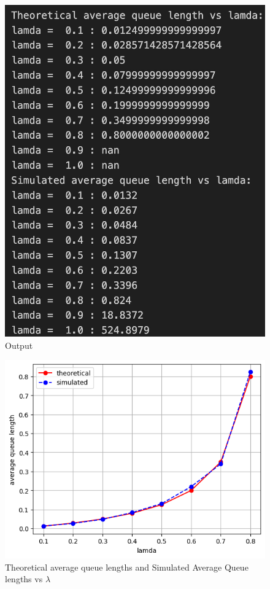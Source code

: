 \documentclass[11pt, a4paper]{article}
\begin{document}
\begin{figure}[H]
     \centering
     \includegraphics[scale=0.3]{Figure_6.png}
     \caption{Output}
\end{figure}
\begin{figure}[H]
     \centering
     \includegraphics[scale=0.6]{Figure_7.png}
     \caption{Theoretical average queue lengths and Simulated Average Queue lengths vs $\lambda$}
\end{figure}
\end{document}
